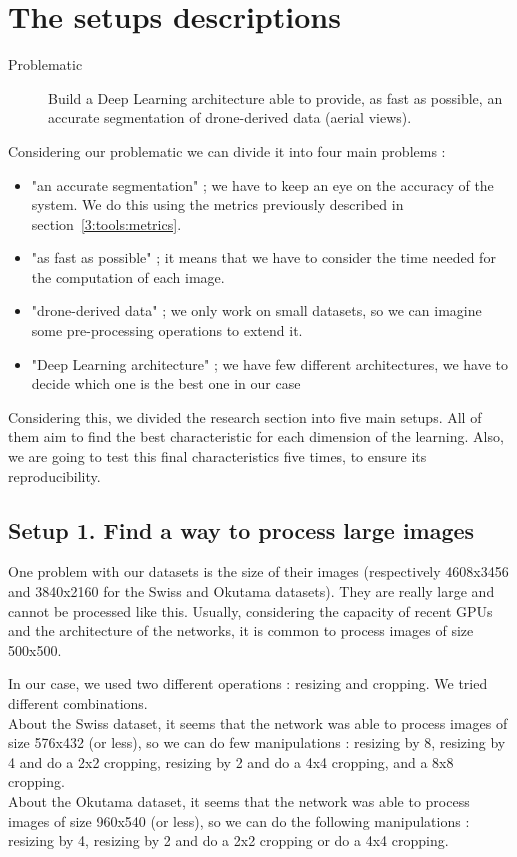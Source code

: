 \section{The setups descriptions} \label{3:setups}
\begin{description}
\item[Problematic] Build a Deep Learning architecture able to provide, as fast as possible, an accurate segmentation of drone-derived data (aerial views).
\end{description}
Considering our problematic we can divide it into four main problems :
\begin{itemize}
\item "an accurate segmentation" ; we have to keep an eye on the accuracy of the system. We do this using the metrics previously described in section~\ref{3:tools:metrics}.
\item "as fast as possible" ; it means that we have to consider the time needed for the computation of each image.
\item "drone-derived data" ; we only work on small datasets, so we can imagine some pre-processing operations to extend it.
\item "Deep Learning architecture" ; we have few different architectures, we have to decide which one is the best one in our case
\end{itemize}

Considering this, we divided the research section into five main setups. All of them aim to find the best characteristic for each dimension of the learning. Also, we are going to test this final characteristics five times, to ensure its reproducibility.

\subsection*{Setup 1. Find a way to process large images}
One problem with our datasets is the size of their images (respectively 4608x3456 and 3840x2160 for the Swiss and Okutama datasets). They are really large and cannot be processed like this. Usually, considering the capacity of recent GPUs and the architecture of the networks, it is common to process images of size 500x500.

In our case, we used two different operations : resizing and cropping. We tried different combinations. \\
About the Swiss dataset, it seems that the network was able to process images of size 576x432 (or less), so we can do few manipulations : resizing by 8, resizing by 4 and do a 2x2 cropping, resizing by 2 and do a 4x4 cropping, and a 8x8 cropping. \\
About the Okutama dataset, it seems that the network was able to process images of size 960x540 (or less), so we can do the following manipulations : resizing by 4, resizing by 2 and do a 2x2 cropping or do a 4x4 cropping.

